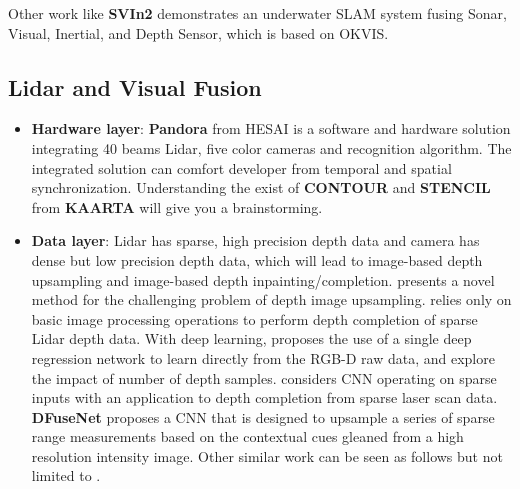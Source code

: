 \documentclass[journal,transmag]{IEEEtran}
\begin{document}
Other work like \textbf{SVIn2} \cite{rahmansvin2} demonstrates an underwater SLAM system fusing Sonar, Visual, Inertial, and Depth Sensor, which is based on OKVIS.

\subsection{Lidar and Visual Fusion}
\begin{itemize}
    \item \textbf{Hardware layer}: \textbf{Pandora} from HESAI is a software and hardware solution integrating 40 beams Lidar, five color cameras and recognition algorithm. The integrated solution can comfort developer from temporal and spatial synchronization. Understanding the exist of \textbf{CONTOUR} and \textbf{STENCIL} from \textbf{KAARTA} will give you a brainstorming.
    \item \textbf{Data layer}: Lidar has sparse, high precision depth data and camera has dense but low precision depth data, which will lead to image-based depth upsampling and image-based depth inpainting/completion. \cite{ferstl2013image} presents a novel method for the challenging problem of depth image upsampling. \cite{ku2018defense} relies only on basic image processing operations to perform depth completion of sparse Lidar depth data. With deep learning, \cite{mal2018sparse} proposes the use of a single deep regression network to learn directly from the RGB-D raw data, and explore the impact of number of depth samples. \cite{uhrig2017sparsity} considers CNN operating on sparse inputs with an application to depth completion from sparse laser scan data. \textbf{DFuseNet} \cite{shivakumar2019dfusenet} proposes a CNN that is designed to upsample a series of sparse range measurements based on the contextual cues gleaned from a high resolution intensity image. Other similar work can be seen as follows but not limited to \cite{chen2018estimating} \cite{eldesokey2018propagating}.

\end{itemize}
\end{document}
